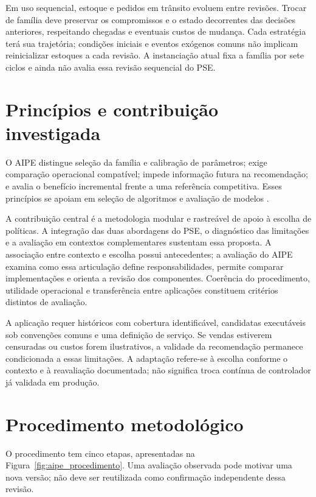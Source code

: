 Em uso sequencial, estoque e pedidos em trânsito evoluem entre revisões. Trocar de família deve preservar os compromissos e o estado decorrentes das decisões anteriores, respeitando chegadas e eventuais custos de mudança. Cada estratégia terá sua trajetória; condições iniciais e eventos exógenos comuns não implicam reinicializar estoques a cada revisão. A instanciação atual fixa a família por sete ciclos e ainda não avalia essa revisão sequencial do PSE.

\section{Princípios e contribuição investigada}
O AIPE distingue seleção da família e calibração de parâmetros; exige comparação operacional compatível; impede informação futura na recomendação; e avalia o benefício incremental frente a uma referência competitiva. Esses princípios se apoiam em seleção de algoritmos e avaliação de modelos \citep{Rice1976AlgorithmSelection,Kerschke2019AutomatedAlgorithmSelection,CawleyTalbot2010}.

A contribuição central é a metodologia modular e rastreável de apoio à escolha de políticas. A integração das duas abordagens do PSE, o diagnóstico das limitações e a avaliação em contextos complementares sustentam essa proposta. A associação entre contexto e escolha possui antecedentes; a avaliação do AIPE examina como essa articulação define responsabilidades, permite comparar implementações e orienta a revisão dos componentes. Coerência do procedimento, utilidade operacional e transferência entre aplicações constituem critérios distintos de avaliação.

A aplicação requer históricos com cobertura identificável, candidatas executáveis sob convenções comuns e uma definição de serviço. Se vendas estiverem censuradas ou custos forem ilustrativos, a validade da recomendação permanece condicionada a essas limitações. A adaptação refere-se à escolha conforme o contexto e à reavaliação documentada; não significa troca contínua de controlador já validada em produção.

\section{Procedimento metodológico}
\label{sec:procedimento_aipe}
O procedimento tem cinco etapas, apresentadas na Figura~\ref{fig:aipe_procedimento}. Uma avaliação observada pode motivar uma nova versão; não deve ser reutilizada como confirmação independente dessa revisão.

